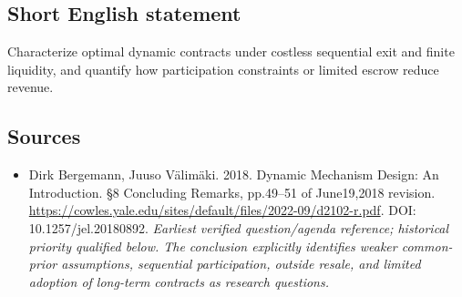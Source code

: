 \documentclass[11pt]{article}
\begin{document}
\subsection{Short English statement}
Characterize optimal dynamic contracts under costless sequential exit and finite liquidity, and quantify how participation constraints or limited escrow reduce revenue.

\subsection{Sources}
\begin{itemize}\raggedright
\item[\textnormal{[S1]}]\hypertarget{source:30007573:1}{} Dirk Bergemann, Juuso Välimäki. 2018. Dynamic Mechanism Design: An Introduction. §8 Concluding Remarks, pp.49–51 of June19,2018 revision.
\url{https://cowles.yale.edu/sites/default/files/2022-09/d2102-r.pdf}.
DOI: 10.1257/jel.20180892.
{\small\textit{Earliest verified question/agenda reference; historical priority qualified below. The conclusion explicitly identifies weaker common-prior assumptions, sequential participation, outside resale, and limited adoption of long-term contracts as research questions.}}
\end{itemize}
\end{document}
